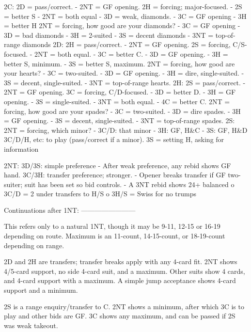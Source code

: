 2C:
   2D = pass/correct.
      - 2NT = GF opening.
   2H = forcing; major-focused.
      - 2S = better S
      - 2NT = both equal
      - 3D = weak, diamonds.
      - 3C = GF opening
      - 3H = better H
   2NT = forcing, how good are your diamonds?
      - 3C = GF opening
      - 3D = bad diamonds
      - 3H = 2-suited
      - 3S = decent diamonds
      - 3NT = top-of-range diamonds
2D:
   2H = pass/correct.
      - 2NT = GF opening.
   2S = forcing, C/S-focused.
      - 2NT = both equal.
      - 3C = better C.
      - 3D = GF opening.
      - 3H = better S, minimum.
      - 3S = better S, maximum.
   2NT = forcing, how good are your hearts?
      - 3C = two-suited.
      - 3D = GF opening.
      - 3H = dire, single-suited.
      - 3S = decent, single-suited.
      - 3NT = top-of-range hearts.
2H:
   2S = pass/correct.
      - 2NT = GF opening.
   3C = forcing, C/D-focused.
      - 3D = better D.
      - 3H = GF opening.
      - 3S = single-suited.
      - 3NT = both equal.
      - 4C = better C.
   2NT = forcing, how good are your spades?
      - 3C = two-suited.
      - 3D = dire spades.
      - 3H = GF opening.
      - 3S = decent, single-suited.
      - 3NT = top-of-range spades.
2S:
   2NT = forcing, which minor?
      - 3C/D: that minor
      - 3H: GF, H&C
      - 3S: GF, H&D
   3C/D/H, etc: to play (pass/correct if a minor).
   3S = setting H, asking for information

2NT:
   3D/3S: simple preference
      - After weak preference, any rebid shows GF hand.
   3C/3H: transfer preference; stronger.
      - Opener breaks transfer if GF two-suiter; suit has been set so bid controls.
      - A 3NT rebid shows 24+ balanced
         o 3C/D = 2 under transfers to H/S
         o 3H/S = Swiss for no trumps


Continuations after 1NT:
------------------------

This refers only to a natural 1NT, though it may be 9-11, 12-15 or 16-19
depending on route. Maximum is an 11-count, 14-15-count, or 18-19-count
depending on range.

2D and 2H are transfers; transfer breaks apply with any 4-card fit.  2NT
shows 4/5-card support, no side 4-card suit, and a maximum.  Other suits
show 4 cards, and 4-card support with a maximum.  A simple jump acceptance
shows 4-card support and a minimum.

2S is a range enquiry/transfer to C.  2NT shows a minimum, after which 3C
is to play and other bids are GF.  3C shows any maximum, and can be passed
if 2S was weak takeout.

